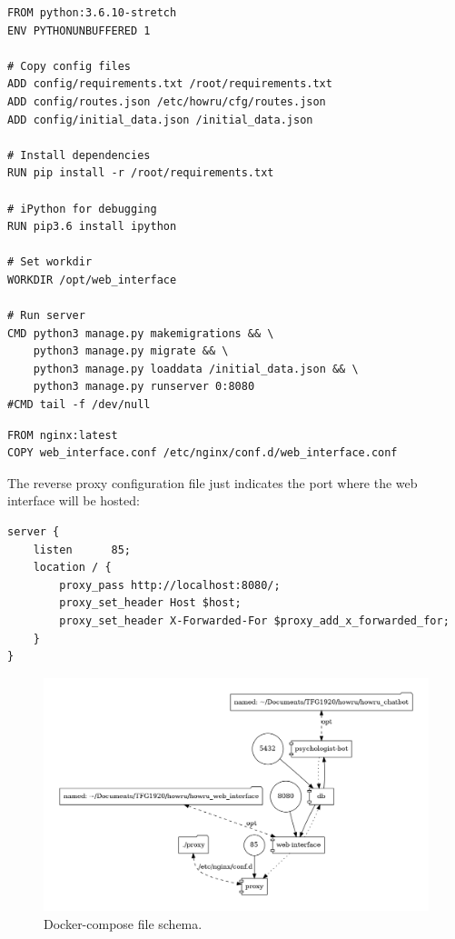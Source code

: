 \documentclass[12pt,english]{article}
\begin{document}
\begin{lstlisting}[language=nginx, caption={HOW-R-U web interface Dockerfile}, captionpos=b]
FROM python:3.6.10-stretch
ENV PYTHONUNBUFFERED 1

# Copy config files
ADD config/requirements.txt /root/requirements.txt
ADD config/routes.json /etc/howru/cfg/routes.json
ADD config/initial_data.json /initial_data.json

# Install dependencies
RUN pip install -r /root/requirements.txt

# iPython for debugging
RUN pip3.6 install ipython

# Set workdir
WORKDIR /opt/web_interface

# Run server
CMD python3 manage.py makemigrations && \
    python3 manage.py migrate && \
    python3 manage.py loaddata /initial_data.json && \
    python3 manage.py runserver 0:8080
#CMD tail -f /dev/null
\end{lstlisting}

\begin{lstlisting}[language=docker, caption={HOW-R-U web reverse proxy Dockerfile}, captionpos=b]
FROM nginx:latest
COPY web_interface.conf /etc/nginx/conf.d/web_interface.conf
\end{lstlisting}

The reverse proxy configuration file just indicates the port where the web interface will be hosted:
\begin{lstlisting}[language=nginx, mathescape=false, caption={HOW-R-U web reverse proxy configuration file}, captionpos=b]
server {
    listen      85;
    location / {
        proxy_pass http://localhost:8080/;
        proxy_set_header Host $host;
        proxy_set_header X-Forwarded-For $proxy_add_x_forwarded_for;
    }
}
\end{lstlisting}

\begin{figure}[H]
  \centering
  \includegraphics[width=\textwidth]{docker-compose.png}
  \caption{Docker-compose file schema.}
\end{figure}
\end{document}
